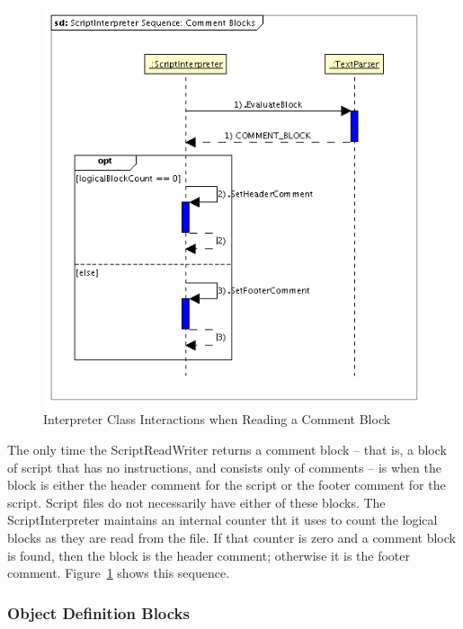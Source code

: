 \begin{figure}[htb]
\begin{center}
\includegraphics[280,294]{Images/ScriptInterpreterSequenceCommentBlocks.png}
\caption{\label{figure:InterpreterReadInteractionsCommentBlock}Interpreter Class Interactions when
Reading a Comment Block}
\end{center}
\end{figure}

The only time the ScriptReadWriter returns a comment block -- that is, a block of script that has
no instructions, and consists only of comments -- is when the block is either the header comment
for the script or the footer comment for the script.  Script files do not necessarily have either
of these blocks.  The ScriptInterpreter maintains an internal counter tht it uses to count the
logical blocks as they are read from the file.  If that counter is zero and a comment block is
found, then the block is the header comment; otherwise it is the footer comment.
Figure~\ref{figure:InterpreterReadInteractionsCommentBlock} shows this sequence.

\subsubsection{Object Definition Blocks}

